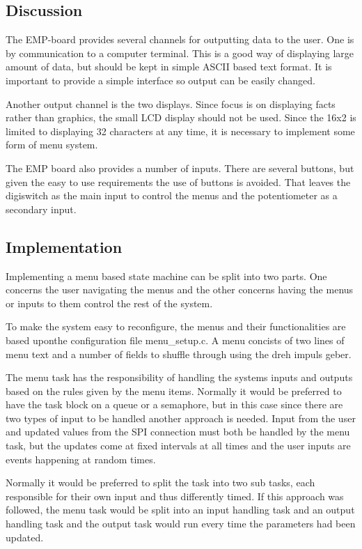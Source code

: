 \subsection{Discussion}
The EMP-board provides several channels for outputting data to the user. One is
by communication to a computer terminal. This is a good way of displaying large
amount of data, but should be kept in simple ASCII based text format. It is
important to provide a simple interface so output can be easily changed.

Another output channel is the two displays. Since focus is on displaying facts
rather than graphics, the small LCD display should not be used. Since the 16x2
is limited to displaying 32 characters at any time, it is necessary to implement
some form of menu system.
 
The EMP board also provides a number of inputs. There are several buttons, but
given the easy to use requirements the use of buttons is avoided. That leaves
the digiswitch as the main input to control the menus and the potentiometer as a
secondary input.



\subsection{Implementation}
Implementing a menu based state machine can be split into two parts. One
concerns the user navigating the menus and the other concerns having the menus or inputs to them
control the rest of the system. 

To make the system easy to reconfigure, the menus and their functionalities are based uponthe configuration file menu\_setup.c. A menu concists of two lines of menu text and a number of fields to shuffle through using the dreh impuls geber. 

The menu task has the responsibility of handling the systems inputs and outputs based on the rules given by the menu items. Normally it would be preferred to have the task block on a queue or a semaphore, but in this case since there are two types of input to be handled another approach is needed.  Input from the user and updated values from the SPI connection must both be handled by the menu task, but the updates come at fixed intervals at all times and the user inputs are events happening at random times.

Normally it would be preferred to split the task into two sub tasks, each responsible for their own input and thus differently timed. If this approach was followed, the menu task would be split into an input handling task and an output handling task and the output task would run every time the parameters had been updated. 

